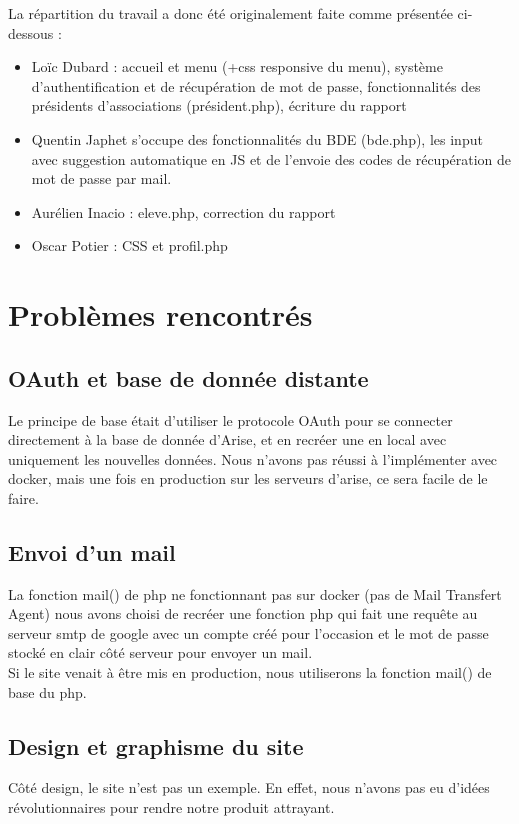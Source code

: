 \documentclass[french]{article}
\begin{document}
La répartition du travail a donc été originalement faite comme présentée ci-dessous : \\

\begin{itemize}
	\item Loïc Dubard : accueil et menu (+css responsive du menu), système d'authentification et de récupération de mot de passe, fonctionnalités des présidents d'associations (président.php), écriture du rapport\\ 
	\item Quentin Japhet s'occupe des fonctionnalités du BDE (bde.php), les input avec suggestion automatique en JS et de l'envoie des codes de récupération de mot de passe par mail. \\
	\item Aurélien Inacio : eleve.php, correction du rapport\\
	\item Oscar Potier : CSS et profil.php\\
\end{itemize}

\section{Problèmes rencontrés}
\subsection{OAuth et base de donnée distante}
Le principe de base était d'utiliser le protocole OAuth pour se connecter directement à la base de donnée d'Arise, et en recréer une en local avec uniquement les nouvelles données. Nous n'avons pas réussi à l'implémenter avec docker, mais une fois en production sur les serveurs d'arise, ce sera facile de le faire.  

\subsection{Envoi d'un mail}
La fonction mail() de php ne fonctionnant pas sur docker (pas de Mail Transfert Agent) nous avons choisi de recréer une fonction php qui fait une requête au serveur smtp de google avec un compte créé pour l'occasion et le mot de passe stocké en clair côté serveur pour envoyer un mail.\\

Si le site venait à être mis en production, nous utiliserons la fonction mail() de base du php.\\

\subsection{Design et graphisme du site}
Côté design, le site n'est pas un exemple. En effet, nous n'avons pas eu d'idées révolutionnaires pour rendre notre produit attrayant.
\end{document}
